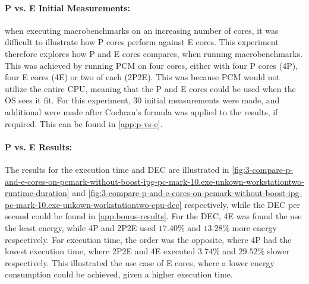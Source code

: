 

\paragraph{P vs. E Initial Measurements:} when executing macrobenchmarks on an increasing number of cores, it was difficult to illustrate how P cores perform against E cores. This experiment therefore explores how P and E cores compares, when running macrobenchmarks. This was achieved by running PCM on four cores, either with four P cores (4P), four E cores (4E) or two of each (2P2E). This was because PCM would not utilize the entire CPU, meaning that the P and E cores could be used when the OS sees it fit. For this experiment, $30$ initial measurements were made, and additional were made after Cochran's formula was applied to the results, if required. This can be found in \cref{app:p-vs-e}.



\paragraph{P vs. E Results:} The results for the execution time and DEC are illustrated in \cref{fig:3-compare-p-and-e-cores-on-pcmark-without-boost-ipg-pc-mark-10.exe-unkown-workstationtwo-runtime-duration} and  \cref{fig:3-compare-p-and-e-cores-on-pcmark-without-boost-ipg-pc-mark-10.exe-unkown-workstationtwo-cpu-dec} respectively, while the DEC per second could be found in \cref{app:bonus-results}. For the DEC, 4E was found the use the least energy, while 4P and 2P2E used $17.40\%$ and $13.28\%$ more energy respectively. For execution time, the order was the opposite, where 4P had the lowest execution time, where 2P2E and 4E executed $3.74\%$ and $29.52\%$ slower respectively. This illustrated the use case of E cores, where a lower energy consumption could be achieved, given a higher execution time.  



